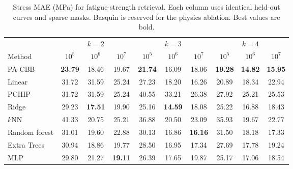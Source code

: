 \begin{table}[t]
\caption{Stress MAE (MPa) for fatigue-strength retrieval. Each column uses identical held-out curves and sparse masks. Basquin is reserved for the physics ablation. Best values are bold.}
\label{tab:downstream_strength_baselines}
\centering
\scriptsize
\setlength{\tabcolsep}{3.2pt}
\begin{tabular}{lccc|ccc|ccc}
\toprule
& \multicolumn{3}{c}{$k=2$} & \multicolumn{3}{c}{$k=3$} & \multicolumn{3}{c}{$k=4$} \\
\cmidrule(lr){2-4}\cmidrule(lr){5-7}\cmidrule(lr){8-10}
Method & $10^5$ & $10^6$ & $10^7$ & $10^5$ & $10^6$ & $10^7$ & $10^5$ & $10^6$ & $10^7$ \\
\midrule
PA-CBB & \textbf{23.79} & 18.46 & 19.67 & \textbf{21.74} & 16.09 & 18.06 & \textbf{19.28} & \textbf{14.82} & \textbf{15.95} \\
Linear & 31.72 & 31.59 & 25.24 & 27.23 & 18.20 & 16.26 & 20.89 & 18.34 & 22.94 \\
PCHIP & 31.72 & 31.59 & 25.24 & 40.55 & 33.21 & 26.38 & 27.92 & 25.21 & 25.53 \\
Ridge & 29.23 & \textbf{17.51} & 19.90 & 25.16 & \textbf{14.59} & 18.08 & 25.22 & 16.88 & 18.43 \\
$k$NN & 41.33 & 20.75 & 25.21 & 36.88 & 20.50 & 23.09 & 35.93 & 19.67 & 22.77 \\
Random forest & 31.01 & 19.60 & 22.88 & 30.13 & 16.86 & \textbf{16.16} & 31.50 & 18.18 & 17.33 \\
Extra Trees & 30.94 & 18.86 & 19.77 & 28.50 & 16.95 & 17.34 & 27.69 & 17.78 & 19.24 \\
MLP & 29.80 & 21.27 & \textbf{19.11} & 26.39 & 17.65 & 19.87 & 25.17 & 17.06 & 18.54 \\
\bottomrule
\end{tabular}
\end{table}
